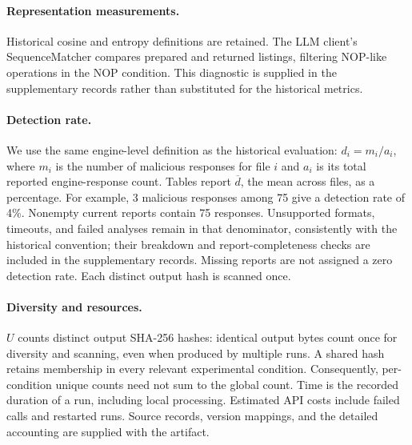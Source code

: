 \paragraph{Representation measurements.}
Historical cosine and entropy definitions are retained. The LLM client's
SequenceMatcher compares prepared and returned listings, filtering
NOP-like operations in the NOP condition. This diagnostic is supplied in
the supplementary records rather than substituted for the historical metrics.

\paragraph{Detection rate.}
We use the same engine-level definition as the historical evaluation:
$d_i=m_i/a_i$, where $m_i$ is the number of malicious responses for file
$i$ and $a_i$ is its total reported engine-response count. Tables report
$\overline d$, the mean across files, as a percentage. For example,
3 malicious responses among 75 give a detection rate of 4\%.
Nonempty current reports contain 75 responses. Unsupported formats,
timeouts, and failed analyses remain in that denominator, consistently
with the historical convention; their breakdown and report-completeness
checks are included in the supplementary records. Missing reports are not
assigned a zero detection rate. Each distinct output hash is scanned once.

\paragraph{Diversity and resources.}
$U$ counts distinct output SHA-256 hashes: identical output bytes count
once for diversity and scanning, even when produced by multiple runs.
A shared hash retains membership in every relevant experimental condition.
Consequently, per-condition unique counts need not sum to the global count.
Time is the recorded duration of a run, including local processing.
Estimated API costs include failed calls and restarted runs. Source records,
version mappings, and the detailed accounting are supplied with the artifact.
